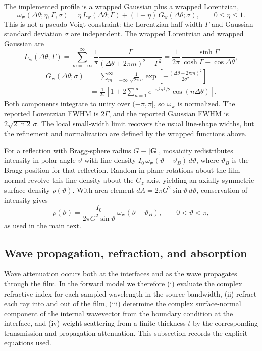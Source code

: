 \documentclass[11pt]{article}
\begin{document}
The implemented profile is a wrapped Gaussian plus a wrapped Lorentzian,
\[
  \omega_{\mathrm w}(\Delta\theta;\eta,\Gamma,\sigma)
  =\eta\,L_{\mathrm w}(\Delta\theta;\Gamma)+(1-\eta)\,G_{\mathrm w}(\Delta\theta;\sigma),
  \qquad 0\le \eta \le 1.
\]
This is not a pseudo-Voigt constraint: the Lorentzian half-width $\Gamma$ and Gaussian standard deviation $\sigma$ are independent. The wrapped Lorentzian and wrapped Gaussian are
\[
  L_{\mathrm w}(\Delta\theta;\Gamma)=
  \sum_{m=-\infty}^{\infty}\frac{1}{\pi}\frac{\Gamma}{(\Delta\theta+2\pi m)^2+\Gamma^2}
  =\frac{1}{2\pi}\,\frac{\sinh\Gamma}{\cosh\Gamma-\cos\Delta\theta},
\]
\[
  \begin{aligned}
    G_{\mathrm w}(\Delta\theta;\sigma)
    &= \sum_{m=-\infty}^{\infty}\frac{1}{\sqrt{2\pi}\sigma}
       \exp\!\left[-\frac{(\Delta\theta+2\pi m)^2}{2\sigma^2}\right] \\
    &= \frac{1}{2\pi}\!\left[
         1+2\sum_{n=1}^{\infty}e^{-n^2\sigma^2/2}\cos(n\Delta\theta)
       \right].
  \end{aligned}
\]
Both components integrate to unity over $(-\pi,\pi]$, so $\omega_{\mathrm w}$ is normalized. The reported Lorentzian FWHM is $2\Gamma$, and the reported Gaussian FWHM is $2\sqrt{2\ln 2}\,\sigma$. The local small-width limit recovers the usual line-shape widths, but the refinement and normalization are defined by the wrapped functions above.

For a reflection with Bragg-sphere radius $G \equiv |\mathbf G|$, mosaicity redistributes intensity in polar angle $\vartheta$ with line density $I_0\,\omega_{\mathrm w}(\vartheta-\vartheta_B)\,d\vartheta$, where $\vartheta_B$ is the Bragg position for that reflection. Random in-plane rotations about the film normal revolve this line density about the $G_z$ axis, yielding an axially symmetric surface density $\rho(\vartheta)$. With area element $dA=2\pi G^2\sin\vartheta\,d\vartheta$, conservation of intensity gives
\[
  \rho(\vartheta)=\frac{I_0}{2\pi G^2\sin\vartheta}\,\omega_{\mathrm w}(\vartheta-\vartheta_B),
  \qquad 0<\vartheta<\pi,
\]
as used in the main text.

\subsection{Wave propagation, refraction, and absorption}
\label{subsec:si_refraction_absorption}

Wave attenuation occurs both at the interfaces and as the wave propagates through the film. In the
forward model we therefore (i) evaluate the complex refractive index for each sampled wavelength
in the source bandwidth, (ii) refract each ray into and out of the film, (iii) determine the complex
surface-normal component of the internal wavevector from the boundary condition at the interface,
and (iv) weight scattering from a finite thickness $t$ by the corresponding transmission and
propagation attenuation. This subsection records the explicit equations used.
\end{document}
